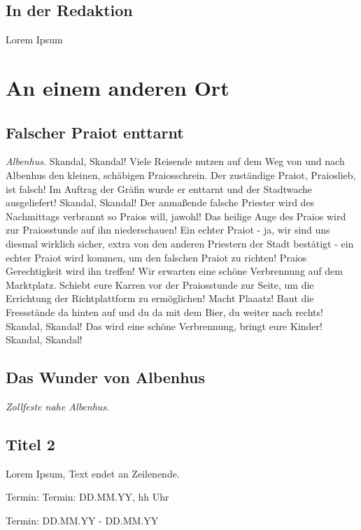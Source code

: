 \documentclass[final]{multiversum}
\begin{document}
\subsection{In der Redaktion}
Lorem Ipsum

\section{An einem anderen Ort}

\subsection{Falscher Praiot enttarnt}
\textit{Albenhus.} 
Skandal, Skandal!
Viele Reisende nutzen auf dem Weg von und nach Albenhus den kleinen, schäbigen Praiosschrein.
Der zuständige Praiot, Praioslieb, ist falsch!
Im Auftrag der Gräfin wurde er enttarnt und der Stadtwache ausgeliefert!
Skandal, Skandal!
Der anmaßende falsche Priester wird des Nachmittags verbrannt so Praios will, jawohl!
Das heilige Auge des Praios wird zur Praiosstunde auf ihn niederschauen!
Ein echter Praiot - ja, wir sind uns diesmal wirklich sicher, extra von den anderen Priestern der Stadt bestätigt - ein echter Praiot wird kommen, um den falschen Praiot zu richten!
Praios Gerechtigkeit wird ihn treffen!
Wir erwarten eine schöne Verbrennung auf dem Marktplatz.
Schiebt eure Karren vor der Praiosstunde zur Seite, um die Errichtung der Richtplattform zu ermöglichen!
Macht Plaaatz!
Baut die Fressstände da hinten auf und du da mit dem Bier, du weiter nach rechts!
Skandal, Skandal!
Das wird eine schöne Verbrennung, bringt eure Kinder!
Skandal, Skandal!

\subsection{Das Wunder von Albenhus}
\textit{Zollfeste nahe Albenhus.} 

\subsection{Titel 2}
Lorem Ipsum, Text endet an Zeilenende.


\begin{termine}
\item Termin: Termin: DD.MM.YY, hh Uhr
  \item Termin: DD.MM.YY - DD.MM.YY
\end{termine}
\impressum
\end{document}
